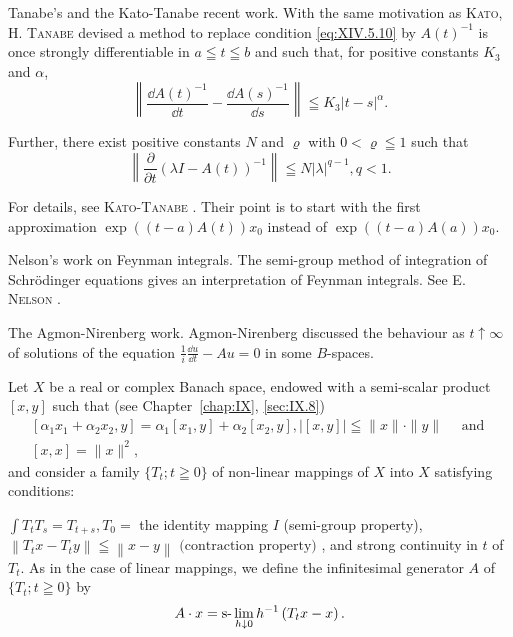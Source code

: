 \label{eq:XIV.5.10'} 

Tanabe's and the Kato-Tanabe recent work. With the same motivation as \textsc{Kato}, H. \textsc{Tanabe} \cite{kato134} devised a method to replace condition \eqref{eq:XIV.5.10} by 
$A(t)^{-1}$ is once strongly differentiable in $a \leqq t \leqq b$ 
and such that, for positive constants $K_{3}$ and $\alpha$, 
\begin{equation}\tag{10''}\label{eq:XIV.5.10''}
\left\| \frac {\dd A (t) ^{-1}}{\dd t} - \frac {\dd A (s) ^{-1}}{\dd s} \right\| \leqq K _{3} | t - s | ^{\alpha}.
\end{equation}

Further, there exist positive constants $N$ and $\varrho$ with $0 < \varrho \leqq 1$ such that 
\[
\left\| \frac {\partial}{\partial t} (\lambda I - A (t)) ^{-1} \right\| \leqq N | \lambda | ^{q-1}, q < 1.
\]

For details, see \textsc{Kato}-\textsc{Tanabe} \cite{kato141}. Their point is to start with the first approximation $\exp((t-a)A(t))x_0$ instead of $\exp((t-a)A(a))x_0$. 

Nelson's work on Feynman integrals. The semi-group method of integration of Schrödinger equations gives an interpretation of Feynman integrals. See E. \textsc{Nelson} \cite{nelson227}. 

The Agmon-Nirenberg work. Agmon-Nirenberg \cite{agmon3} discussed the behaviour as $t \uparrow \infty$ of solutions of the equation $\frac{1}{i} \frac{\dd u}{\dd t} - Au = 0$ in some $B$-spaces. 


\label{sec:XIV.6}

Let $X$ be a real or complex Banach space, endowed with a semi-scalar product $[x, y]$ such that (see Chapter~\ref{chap:IX}, \ref{sec:IX.8}) 
\begin{equation}\label{eq:XIV.6.1}
\begin{gathered}
\left[ \alpha_{1} x _{1} + \alpha_{2} x _{2}, y \right] = \alpha_{1} \left[ x _{1}, y \right] + \alpha_{2} \left[ x _{2}, y \right], | [ x, y ] | \leqq \| x \| \cdot \| y \| \quad \text{ and }
\\
{}[ x, x ] = \| x \| ^{2},
\end{gathered}
\end{equation}
and consider a family $\{T_t; t \geqq 0\}$ of non-linear mappings of $X$ into $X$ satisfying conditions: 

$\int T_{t}T_{s} = T_{t+s}, T_{0} =$ the identity mapping $I$ (semi-group property), 
$\left\|T_{t}x-T_{t}y\right\|\leqq\left\|x-y\right\|\text{ (contraction property) }$, 
and strong continuity in $t$ of $T_{t}$. As in the case of linear mappings, we define the infinitesimal generator $A$ of $\{T_{t}; t \geqq 0\}$ by 
\[
A \cdot x = \text{s-}\lim _{h \downarrow 0} h ^{-1} \left(T _{t} x - x\right).
\]

